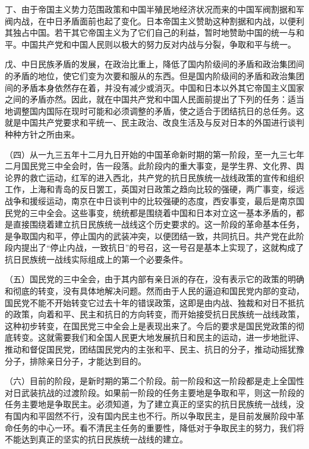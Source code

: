 丁、由于帝国主义势力范围政策和中国半殖民地经济状况而来的中国军阀割据和军阀内战，在中日矛盾面前也起了变化。日本帝国主义赞助这种割据和内战，以便利其独占中国。若干其它帝国主义为了它们自己的利益，暂时地赞助中国的统一与和平。中国共产党和中国人民则以极大的努力反对内战与分裂，争取和平与统一。

戊、中日民族矛盾的发展，在政治比重上，降低了国内阶级间的矛盾和政治集团间的矛盾的地位，使它们变为次要和服从的东西。但是国内阶级间的矛盾和政治集团间的矛盾本身依然存在着，并没有减少或消灭。中国和日本以外其它帝国主义国家之间的矛盾亦然。因此，就在中国共产党和中国人民面前提出了下列的任务：适当地调整国内国际在现时可能和必须调整的矛盾，使之适合于团结抗日的总任务。这就是中国共产党要求和平统一、民主政治、改良生活及与反对日本的外国进行谈判种种方针之所由来。

（四）从一九三五年十二月九日开始的中国革命新时期的第一阶段，至一九三七年二月国民党三中全会时，告一段落。此阶段内的重大事变，是学生界、文化界、舆论界的救亡运动，红军的进入西北，共产党的抗日民族统一战线政策的宣传和组织工作，上海和青岛的反日罢工，英国对日政策之趋向比较的强硬，两广事变，绥远战争和援绥运动，南京在中日谈判中的比较强硬的态度，西安事变，最后是南京国民党的三中全会。这些事变，统统都是围绕着中国和日本对立这一基本矛盾的，都是直接围绕着建立抗日民族统一战线这个历史要求的。这一阶段的革命基本任务，是争取国内和平，停止国内的武装冲突，以便团结一致，共同抗日。共产党在此阶段内提出了“停止内战，一致抗日”的号召，这一号召是基本上实现了，这就构成了抗日民族统一战线实际组成上的第一个必要条件。

（五）国民党的三中全会，由于其内部有亲日派的存在，没有表示它的政策的明确和彻底的转变，没有具体地解决问题。然而由于人民的逼迫和国民党内部的变动，国民党不能不开始转变它过去十年的错误政策，这即是由内战、独裁和对日不抵抗的政策，向着和平、民主和抗日的方向转变，而开始接受抗日民族统一战线政策，这种初步转变，在国民党三中全会上是表现出来了。今后的要求是国民党政策的彻底转变。这就需要我们和全国人民更大地发展抗日和民主的运动，进一步地批评、推动和督促国民党，团结国民党内的主张和平、民主、抗日的分子，推动动摇犹豫分子，排除亲日分子，才能达到目的。

（六）目前的阶段，是新时期的第二个阶段。前一阶段和这一阶段都是走上全国性对日武装抗战的过渡阶段。如果前一阶段的任务主要地是争取和平，则这一阶段的任务主要地是争取民主。必须知道，为了建立真正的坚实的抗日民族统一战线，没有国内和平固然不行，没有国内民主也不行。所以争取民主，是目前发展阶段中革命任务的中心一环。看不清民主任务的重要性，降低对于争取民主的努力，我们将不能达到真正的坚实的抗日民族统一战线的建立。

